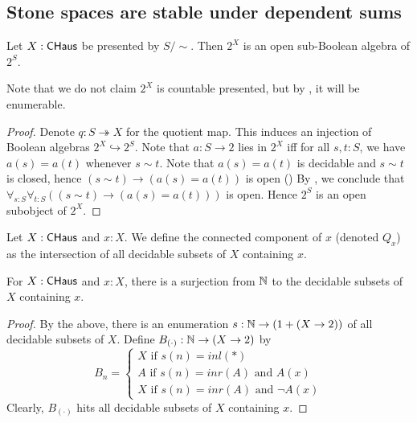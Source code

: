 \subsection{Stone spaces are stable under dependent sums}


\begin{lemma}
  Let $X:\mathsf{CHaus}$ be presented by $S/\sim$. 
  Then $2^X$ is an open sub-Boolean algebra of $2^S$. 
\end{lemma}
Note that we do not claim $2^X$ is countable presented, 
but by , it will be enumerable. 
\begin{proof}
  Denote $q:S \twoheadrightarrow X$ for the quotient map. 
  This induces an injection of Boolean algebras $2^X \hookrightarrow 2^S$.
  Note that $a:S\to 2$ lies in $2^X$ iff for all $s,t:S$, we have $a(s) = a(t)$ whenever $s\sim t$.
  Note that $a(s) = a(t)$ is decidable and $s\sim t$ is closed, hence 
  $(s\sim t) \to (a(s) = a(t))$ is open ()
  By , we conclude that 
  $\forall_{s:S} \forall_{t:S} ((s\sim t) \to (a(s) = a(t)))$ is open. 
  Hence $2^S$ is an open subobject of $2^X$. 
\end{proof}

\begin{definition}
  Let $X:\mathsf{CHaus}$ and $x:X$. 
  We define the connected component of $x$ (denoted $Q_x$)
  as the intersection of all decidable subsets of $X$ containing $x$. 
\end{definition}

\begin{corollary}
  For $X:\mathsf{CHaus}$ and $x:X$, there is a surjection from $\mathbb{N}$ to the decidable subsets of $X$ containing $x$. 
\end{corollary}
\begin{proof}
  By the above, %
  there is an enumeration $s: \mathbb{N} \to (1 + (X \to 2))$ of all decidable subsets of $X$. 
  Define $B_{(\cdot)}:\mathbb{N} \to (X \to 2)$ by 
  $$B_n = \begin{cases}
    X \text { if } s(n) = inl(*) \\
    A \text { if } s(n) = inr(A) \text { and } A(x) \\
    X \text { if } s(n) = inr(A) \text { and } \neg A(x)
  \end{cases}
  $$
  Clearly, $B_{(\cdot)}$ hits all decidable subsets of $X$ containing $x$. 
\end{proof}


